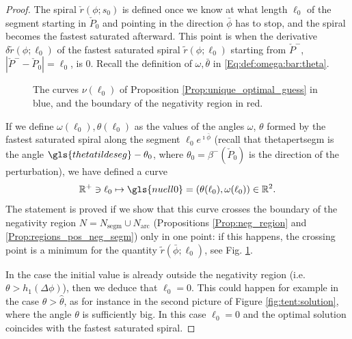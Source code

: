 \documentclass[reqno]{amsart}
\theoremstyle{definition} \newtheorem{definition}{Definition}[section]
\theoremstyle{definition} \newtheorem{remark}[definition]{Remark}
\theoremstyle{plain} \newtheorem{lemma}[definition]{Lemma}
\theoremstyle{plain} \newtheorem{proposition}[definition]{Proposition}
\theoremstyle{plain} \newtheorem{theorem}[definition]{Theorem}
\theoremstyle{plain} \newtheorem{corollary}[definition]{Corollary}
\theoremstyle{definition} \newtheorem{example}[definition]{Example}
\theoremstyle{plain} \newtheorem{claim}[clai]{Claim}
\theoremstyle{definition} \newtheorem{assumption}[definition]{Assumption}
\theoremstyle{definition} \newtheorem{observation}[definition]{Observation}
\newcommand{\R}{\mathbb{R}}
\newcommand{\1}{\mathbbm 1}
\renewcommand{\i}{\imath}
\numberwithin{equation}{section} %
\theoremstyle{plain} \newtheorem*{theorem*}{Theorem}
\theoremstyle{plain} \newtheorem{mthm}[maintheorem]{Main Theorem}
\theoremstyle{plain} \newtheorem*{mthm*}{Main Theorem}
\theoremstyle{plain} \newtheorem*{conjecture*}{Conjecture}
\theoremstyle{plain} \newtheorem{conjecture}[definition]{Conjecture}
\theoremstyle{plain} \newtheorem*{problem*}{Problem}
\begin{document}
\begin{proof}
The spiral $\check r(\phi;s_0)$ is defined once we know at what length $\ell_0$ of the segment starting in $\check P_0$ and pointing in the direction $\bar \phi$ has to stop, and the spiral becomes the fastest saturated afterward. This point is when the derivative $\delta \tilde r(\phi;\ell_0)$ of the fastest saturated spiral $\tilde r(\phi;\ell_0)$ starting from $\check P^-$, $|\check P^- - \check P_0| = \ell_0$, is $0$. Recall the definition of $\omega,\bar\theta$ in \eqref{Eq:def:omega:bar:theta}.

\begin{figure}
\resizebox{.75\textwidth}{!}{}
\caption{The curves $\nu(\ell_0)$ of Proposition \ref{Prop:unique_optimal_guess} in blue, and the boundary of the negativity region in red.}
\label{Fig:nu_funct}
\end{figure}

If we define $\omega(\ell_0), \theta(\ell_0)$ as the values of the angles $\omega$, $\theta$ formed by the fastest saturated spiral along the segment $\ell_0 e^{\i \bar \phi}$ (recall that \gls{thetapertsegm} is the angle $\gls{thetatildeseg} -\theta_0$, where $\theta_0 = \beta^-(\check P_0)$ is the direction of the perturbation), we have defined a curve 
\begin{equation*}
\R^+ \ni \ell_0 \mapsto \gls{nuell0} = (\theta(\ell_0),\omega(\ell_0)) \in \R^2.
\end{equation*}
The statement is proved if we show that this curve crosses the boundary of the negativity region $N = N_\mathrm{segm} \cup N_\mathrm{arc}$ (Propositions \ref{Prop:neg_region} and \ref{Prop:regions_pos_neg_segm}) only in one point: if this happens, the crossing point is a minimum for the quantity $\tilde r(\bar \phi;\ell_0)$, see Fig. \ref{Fig:nu_funct}.

In the case the initial value is already outside the negativity region (i.e. $\theta > h_1(\Delta \phi)$), then we deduce that $\ell_0 = 0$. This could happen for example in the case $\theta>\hat\theta$, as for instance in the second picture of Figure \ref{fig:tent:solution}, where the angle $\theta$ is sufficiently big. In this case $\ell_0=0$ and the optimal solution coincides with the fastest saturated spiral.


\end{proof}
\end{document}
